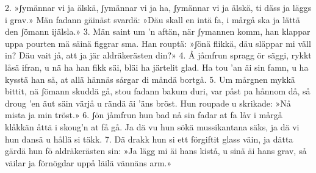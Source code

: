 \begin{adjustwidth}{7mm}{7mm}
2.  »ʃymännar vi ja älskä, ʃymännar vi ja ha,
    ʃymännar vi ja älskä, ti däss ja läggs i grav.»
    Män fadann gäinäst svardä: »Däu skall en intä fa,
    i mårgå ska ja lättä den ʃömann ijälsla.»
3.  Män saint um ’n aftän, när ʃymannen komm,
    han klappar uppa pourten mä säinä figgrar sma.
    Han rouptä: »ʃönä flikkä, däu släppar mi väll in?
    Däu vait jå, att ja jär aldräkerästen din?»
4.  Å jåmfrun spragg ör säggi, rykkt låsä ifran,
    u nä ha han fikk säi, bläi ha järtelit glad.
    Ha tou ’an äi sin famn, u ha kysstä han så,
    at allä hännäs sårgar di måndä bortgå.
5.  Um mårgnen mykkä bittit, nä ʃömann skuddä gå,
    stou fadann bakum duri, var påst pa hånnom då,
    så droug ’en äut säin värjå u rändä äi ’äns bröst.
    Hun roupade u skrikade: »Nå mista ja min tröst.»
6.  ʃön jåmfrun hun bad nå sin fadar at fa låv
    i mårgå klåkkän åttä i skoug’n at få gå.
    Ja dä vu hun sökä mussikantana säks,
    ja dä vi hun dansä u hållä si täkk.
7.  Dä drakk hun si ett förgiftit glass väin,
    ja dätta gärdä hun fö aldräkerästen sin:
    »Ja lägg mi äi hans kistå, u sinä äi hans grav,
    så väilar ja förnögdar uppå läilä vännäns arm.»
\end{adjustwidth}
